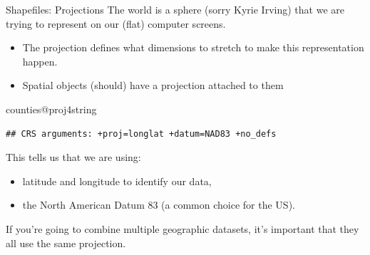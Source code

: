 \documentclass[
  ignorenonframetext,
]{beamer}
\newenvironment{Shaded}{\begin{snugshade}}{\end{snugshade}}
\newcommand{\NormalTok}[1]{#1}
\newcommand{\SpecialCharTok}[1]{\textcolor[rgb]{0.00,0.00,0.00}{#1}}
\begin{document}
\begin{frame}[fragile]{Shapefiles: Projections}
\protect\hypertarget{shapefiles-projections}{}
The world is a sphere (sorry Kyrie Irving) that we are trying to
represent on our (flat) computer screens.

\begin{itemize}
\item
  The projection defines what dimensions to stretch to make this
  representation happen.
\item
  Spatial objects (should) have a projection attached to them
\end{itemize}

\tiny

\begin{Shaded}
\begin{Highlighting}[]
\NormalTok{counties}\SpecialCharTok{@}\NormalTok{proj4string}
\end{Highlighting}
\end{Shaded}

\begin{verbatim}
## CRS arguments: +proj=longlat +datum=NAD83 +no_defs
\end{verbatim}

\normalsize

This tells us that we are using:

\begin{itemize}
\item
  latitude and longitude to identify our data,
\item
  the North American Datum 83 (a common choice for the US).
\end{itemize}

If you're going to combine multiple geographic datasets, it's important
that they all use the same projection.
\end{frame}
\end{document}
